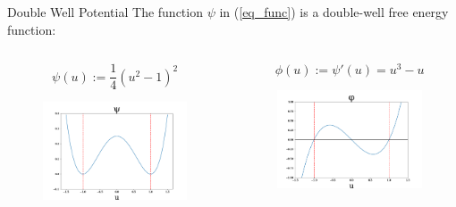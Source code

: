 \documentclass[professionalfont]{beamer}
\theoremstyle{remark}
\begin{document}
\begin{frame}{Double Well Potential}
	The function $\psi$ in (\ref{eq_func}) is a double-well free energy function:

	\begin{columns}
		\begin{column}{.45\paperwidth}

			\begin{equation*}
				\psi(u):=\frac{1}{4}(u^2-1)^2	
			\end{equation*}

			\begin{figure}
				\centering
				\includegraphics[width = .43\paperwidth]{media/psi.png}
			\end{figure}
			
		\end{column}

		\begin{column}{.45\paperwidth}
			
			\begin{equation*}
				\phi(u):=\psi'(u)=u^3-u
			\end{equation*}

			\begin{figure}
				\centering
				\includegraphics[width = .43\paperwidth]{media/phi.png}
			\end{figure}
			

\end{column}
\end{columns}
\end{frame}
\end{document}

